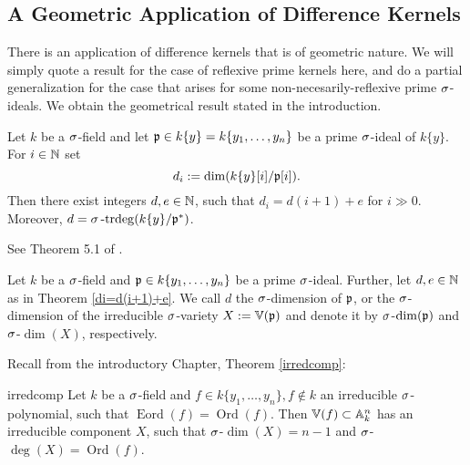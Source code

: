 \subsection{A Geometric Application of Difference Kernels}

There is an application of difference kernels that is of geometric nature. We will simply quote a result for the case of reflexive prime kernels here,
and do a partial generalization for the case that arises for some non-necesarily-reflexive prime $\sigma$-ideals. We obtain the geometrical result stated in the introduction.

\begin{theorem}\label{di=d(i+1)+e}
Let $k$ be a $\sigma$-field and let $\mathfrak{p} \in k\{y\} = k\{y_1,\ldots,y_n\}$ be a prime $\sigma$-ideal of $k\{y\}$. For $i \in \mathbb{N}$ set $$d_i := \dim(k\{y\}[i]/\mathfrak{p}[i]).$$
Then there exist integers $d, e \in \mathbb{N}$, such that $d_i = d(i+1) + e$ for $i \gg 0$. Moreover, $d = \sigma\operatorname{-trdeg}(k\{y\}/\mathfrak{p}^*)$.
\begin{bew}
See Theorem 5.1 of \cite{wibmer}.
\end{bew}
\end{theorem}

\begin{defn}
Let $k$ be a $\sigma$-field and $\mathfrak{p} \in k\{y_1,\ldots,y_n\}$ be a prime $\sigma$-ideal. Further, let $d, e \in \mathbb{N}$ as in Theorem \ref{di=d(i+1)+e}. We call $d$ the $\sigma$-dimension of $\mathfrak{p}$, 
or the $\sigma$-dimension of the irreducible $\sigma$-variety $X:= \mathbb{V}(\mathfrak{p})$ and denote it by $\sigma$-$\dim(\mathfrak{p})$ and $\sigma$-$\dim(X)$, respectively.
\end{defn}

Recall from the introductory Chapter, Theorem \ref{irredcomp}:
\begin{reptheorem}{irredcomp}
Let $k$ be a $\sigma$-field and $f \in k\{y_1,\ldots,y_n\}, f \notin k$ an irreducible $\sigma$-polynomial, such that $\operatorname{Eord}(f) = \operatorname{Ord}(f)$. Then $\mathbb{V}(f) \subset \mathbb{A}_k^n$ has an irreducible component $X$, such that $\sigma$-$\dim(X) = n-1$ and $\sigma$-$\operatorname{deg}(X) = \operatorname{Ord}(f)$.
\end{reptheorem}

